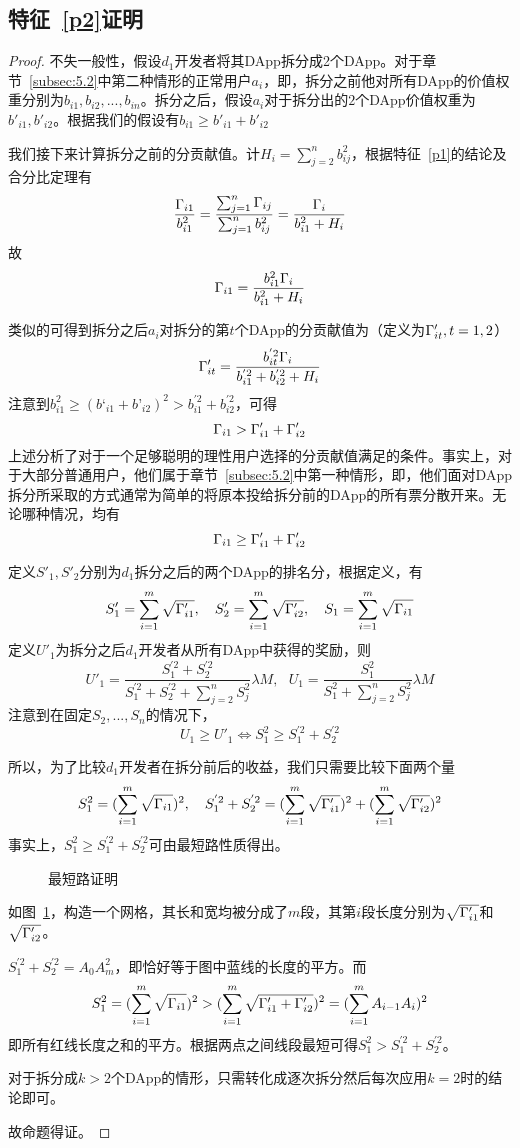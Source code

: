 \subsection{特征~\ref{p2}证明}
\label{subsection:proof2}
\begin{proof}
	 不失一般性，假设$d_1$开发者将其DApp拆分成2个DApp。对于章节~\ref{subsec:5.2}中第二种情形的正常用户$a_i$，即，拆分之前他对所有DApp的价值权重分别为$b_{i1},b_{i2},...,b_{in}$。拆分之后，假设$a_i$对于拆分出的$2$个DApp价值权重为$b'_{i1},b'_{i2}$。根据我们的假设有$b_{i1} \geq b'_{i1}+b'_{i2}$

	 我们接下来计算拆分之前的分贡献值。计$H_i = \sum_{j=2}^n b_{ij}^2$，根据特征~\ref{p1}的结论及合分比定理有
	 $$\frac{\Gamma_{i1}}{b_{i1}^2} = \frac{\sum_{j=1}^n \Gamma_{ij}}{\sum_{j=1}^n b_{ij}^2} = \frac{\Gamma_i}{b_{i1}^2+H_i}$$
	 故
	 $$\Gamma_{i1}=\frac{b_{i1}^2\Gamma_i}{b_{i1}^2+H_i}$$

     类似的可得到拆分之后$a_i$对拆分的第$t$个DApp的分贡献值为（定义为$\Gamma'_{it},t=1,2$）
	 $$\Gamma'_{it} =  \frac{b_{it}^{'2}\Gamma_i}{b_{i1}^{'2}+b_{i2}^{'2}+H_i}$$
	 注意到$b_{i1}^2 \geq (b‘_{i1}+b’_{i2})^2 >b_{i1}^{'2}+b_{i2}^{'2}$，可得
	 $$\Gamma_{i1} > \Gamma'_{i1}+\Gamma'_{i2}$$
	 上述分析了对于一个足够聪明的理性用户选择的分贡献值满足的条件。事实上，对于大部分普通用户，他们属于章节~\ref{subsec:5.2}中第一种情形，即，他们面对DApp拆分所采取的方式通常为简单的将原本投给拆分前的DApp的所有票分散开来。无论哪种情况，均有
	 	$$\Gamma_{i1} \geq \Gamma'_{i1}+\Gamma'_{i2}$$

	 定义$S'_1,S'_2$分别为$d_1$拆分之后的两个DApp的排名分，根据定义，有
	 $$S'_1 =  \sum_{i=1}^m \sqrt{\Gamma'_{i1}},~~~S'_2 =  \sum_{i=1}^m \sqrt{\Gamma'_{i2}},~~~S_1 = \sum_{i=1}^m \sqrt{\Gamma_{i1}}$$
	 定义$U'_1$为拆分之后$d_1$开发者从所有DApp中获得的奖励，则
	 $$U'_1=\frac{S_1^{'2}+S_2^{'2}}{S_1^{'2}+S_2^{'2}+\sum_{j=2}^n S_j^2} \lambda M,~~~U_1=\frac{S^2_1}{S_1^2+\sum_{j=2}^n S_j^2} \lambda M$$
	 注意到在固定$S_2,...,S_n$的情况下，
	 $$ U_1 \geq U'_1 \Leftrightarrow S_1^2 \geq S_1^{'2}+S_2^{'2}$$

	 所以，为了比较$d_1$开发者在拆分前后的收益，我们只需要比较下面两个量
	 $$S_1^2 = (\sum_{i=1}^m \sqrt{\Gamma_{i1}})^2,~~~S_1^{'2}+S_2^{'2}=  (\sum_{i=1}^m \sqrt{\Gamma'_{i1}})^2+(\sum_{i=1}^m \sqrt{\Gamma'_{i2}})^2$$
	 事实上，$S_1^2 \geq S_1^{'2}+S_2^{'2}$可由最短路性质得出。
	 \begin{figure}
	 	\centering
    
	 	\caption{最短路证明 \label{fig:path}}
	 \end{figure}
	 如图~\ref{fig:path}，构造一个网格，其长和宽均被分成了$m$段，其第$i$段长度分别为$\sqrt{\Gamma'_{i1}}$和$\sqrt{\Gamma'_{i2}}$。

	 $S_1^{'2}+S_2^{'2}=A_0A_m^2$，即恰好等于图中蓝线的长度的平方。而
	 $$S_1^2 = (\sum_{i=1}^m \sqrt{\Gamma_{i1}})^2 > (\sum_{i=1}^m \sqrt{\Gamma'_{i1}+\Gamma'_{i2}})^2 = (\sum_{i=1}^m A_{i-1}A_i)^2$$
	 即所有红线长度之和的平方。根据两点之间线段最短可得$S_1^2 >S_1^{'2}+S_2^{'2}$。

	 对于拆分成$k>2$个DApp的情形，只需转化成逐次拆分然后每次应用$k=2$时的结论即可。

	 故命题得证。
\end{proof}

